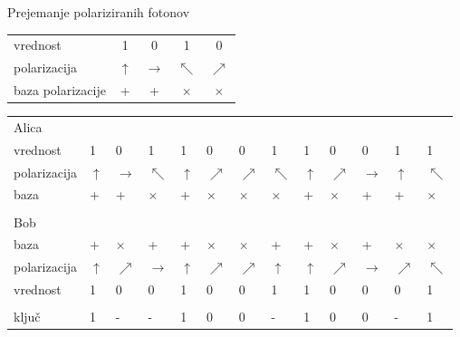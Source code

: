 \documentclass{beamer}
\begin{document}
\begin{frame}{Prejemanje polariziranih fotonov}

\begin{tabular}{l c c c c}
vrednost & 1 & 0 & 1 & 0\\
polarizacija & $\uparrow$ & $\rightarrow$ & $\nwarrow$ & $\nearrow$\\
baza polarizacije & + & + & $\times$ & $\times$\\
\end{tabular}

\bigskip

\begin{tabular}{ l m{0.2 cm} m{0.2 cm} m{0.2 cm} m{0.2 cm} m{0.2 cm} m{0.2 cm} m{0.2 cm} m{0.2 cm} m{0.2 cm} m{0.2 cm} m{0.2 cm} m{0.2 cm}}
Alica\\
vrednost & 1 & 0 & 1 & 1 & 0 & 0 & 1 & 1 & 0 & 0 & 1 & 1 \\
polarizacija & $\uparrow$ & $\rightarrow$ & $\nwarrow$ & $\uparrow$ & $\nearrow$ & $\nearrow$ & $\nwarrow$  & $\uparrow$ & $\nearrow$ & $\rightarrow$ & $\uparrow$ & $\nwarrow$\\
baza & + & + & $\times$ & + & $\times$ & $\times$ & $\times$ & + & $\times$ & + & + & $\times$\\
\\
Bob\\
baza & + & $\times$ & + & + & $\times$ & $\times$ & + & + & $\times$ & + & $\times$ & $\times$\\
polarizacija & $\uparrow$ & $\nearrow$ & $\rightarrow$ & $\uparrow$ & $\nearrow$  & $\nearrow$ & $\uparrow$ & $\uparrow$ & $\nearrow$ & $\rightarrow$ & $\nearrow$ & $\nwarrow$\\
vrednost & 1 & 0 & 0 & 1 & 0 & 0 & 1 & 1 & 0 & 0 & 0 & 1\\
\\
ključ & 1 & - & - & 1 & 0 & 0 & - & 1 & 0 & 0 & - & 1\\
\end{tabular}

\end{frame}

\end{document}
